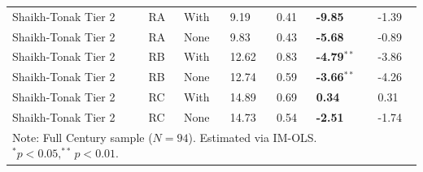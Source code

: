 \begin{table}[h!]
\begin{tabular}{p{3.8cm} p{1.6cm} p{1.6cm} p{1.4cm} p{1.4cm} p{2.0cm} p{1.6cm}}
Shaikh-Tonak Tier 2 & RA & With & 9.19 & 0.41 & \textbf{-9.85} & -1.39 \\
Shaikh-Tonak Tier 2 & RA & None & 9.83 & 0.43 & \textbf{-5.68} & -0.89 \\
Shaikh-Tonak Tier 2 & RB & With & 12.62 & 0.83 & \textbf{-4.79}$^{**}$ & -3.86 \\
Shaikh-Tonak Tier 2 & RB & None & 12.74 & 0.59 & \textbf{-3.66}$^{**}$ & -4.26 \\
Shaikh-Tonak Tier 2 & RC & With & 14.89 & 0.69 & \textbf{0.34} & 0.31 \\
Shaikh-Tonak Tier 2 & RC & None & 14.73 & 0.54 & \textbf{-2.51} & -1.74 \\
\bottomrule
\multicolumn{7}{p{15.0cm}}{\footnotesize Note: Full Century sample ($N=94$). Estimated via IM-OLS. $^*p<0.05, ^{**}p<0.01$.}
\end{tabular}
\end{table}
